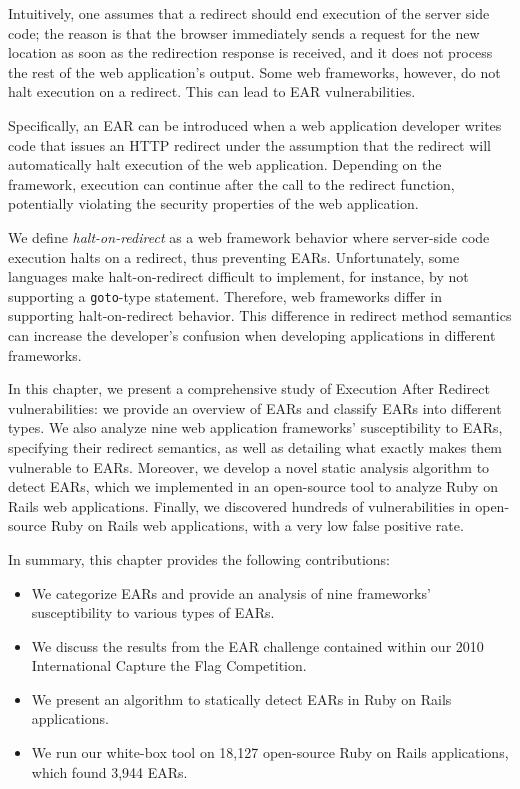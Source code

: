 Intuitively, one assumes that a redirect should end execution of the
server side code; the reason is that the browser immediately sends a
request for the new location as soon as the redirection response is
received, and it does not process the rest of the web application's output. Some
web frameworks, however, do not halt execution on a redirect. This can
lead to EAR vulnerabilities.
 
Specifically, an EAR can be introduced when a web application developer
writes code that issues an HTTP redirect under the assumption that the
redirect will automatically halt execution of the web application.
Depending on the framework, execution can continue after the call to the
redirect function, potentially violating the security properties of the web
application.

We define \emph{halt-on-redirect} as a web framework behavior where
server-side code execution halts on a redirect, thus preventing EARs.
Unfortunately, some languages make halt-on-redirect difficult to implement,
for instance, by not supporting a \texttt{goto}-type statement. Therefore,
web frameworks differ in supporting halt-on-redirect behavior. This
difference in redirect method semantics can increase the developer's
confusion when developing applications in different frameworks.

In this chapter, we present a comprehensive study of Execution After Redirect
vulnerabilities: we provide an overview of EARs and classify EARs into
different types. We also analyze nine web application frameworks'
susceptibility to EARs, specifying their redirect semantics, as well as
detailing what exactly makes them vulnerable to EARs. Moreover, we develop a
novel static analysis algorithm to detect EARs, which we implemented in an
open-source tool to analyze Ruby on Rails web applications. Finally, we
discovered hundreds of vulnerabilities in open-source Ruby on Rails web
applications, with a very low false positive rate.

In summary, this chapter provides the following contributions:

\begin{itemize}

\item We categorize EARs and provide an analysis of nine frameworks'
  susceptibility to various types of EARs.

\item We discuss the results from the EAR challenge contained within our 2010
  International Capture the Flag Competition.

\item We present an algorithm to statically detect EARs in Ruby on
  Rails applications.

\item We run our white-box tool on 18,127 open-source Ruby on
  Rails applications, which found 3,944 EARs.

\end{itemize}

